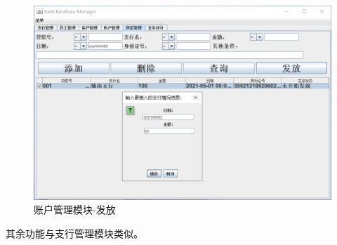 \documentclass{ctexart}
\begin{document}
\begin{figure}[H]
    \centering
    \includegraphics[scale=0.2]{dk2.png}
    \caption{账户管理模块-发放}
\end{figure}
\par
其余功能与支行管理模块类似。
\end{document}
